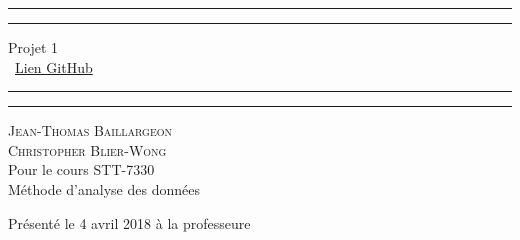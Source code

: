 \begin{titlepage}
	\centering %
	
	\scshape %
	
	\vspace*{\baselineskip} %
	
	
	\rule{\textwidth}{1.6pt}\vspace*{-\baselineskip}\vspace*{2pt} %
	\rule{\textwidth}{0.4pt} %
	
	\vspace{0.75\baselineskip} %
	
	{\LARGE Projet 1\\} %
	\ \href{https://github.com/chblw/stt7330-projet1}{Lien GitHub}
	\vspace{0.75\baselineskip} %
	
	\rule{\textwidth}{0.4pt}\vspace*{-\baselineskip}\vspace{3.2pt} %
	\rule{\textwidth}{1.6pt} %
	
	\vspace{2\baselineskip} %
	
	{\scshape\Large Jean-Thomas Baillargeon \\Christopher Blier-Wong\\} %
	Pour le cours STT-7330\\
	Méthode d'analyse des données \\%
	
	\vspace*{3\baselineskip} %
	
	
	Présenté le 4 avril 2018 à la professeure
	

\end{titlepage}

